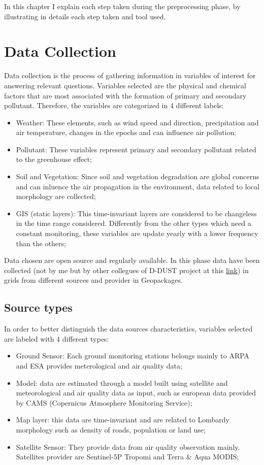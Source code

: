 In this chapter I explain each step taken during the preprocessing phase, by illustrating in details each step taken and tool used.
\section{Data Collection}
Data collection is the process of gathering information in variables of interest for answering relevant questions. 
Variables selected are the physical and chemical factors that are most associated with the formation of primary and secondary pollutant. 
Therefore, the variables are categorized in 4 different labels:
\begin{itemize}
\item Weather: These elements, such as wind speed and direction, precipitation and air temperature, changes in the epochs and can influence air pollution;
\item Pollutant: These variables represent primary and secondary pollutant related to the greenhouse effect;
\item Soil and Vegetation: Since soil and vegetation degradation are global concerns and can inluence the air propagation in the environment, data related to local morphology are collected;
\item GIS (static layers): This time-invariant layers are considered to be changeless in the time range considered. Differently from the other types which need a constant monitoring, these variables are update yearly with a lower frequency than the others;
\end{itemize}
Data chosen are open source and regularly available.
In this phase data have been collected (not by me but by other collegues of D-DUST project at this \href{https://docs.google.com/spreadsheets/d/1-5pwMSc1QlFyC8iIaA-l1fWhWtpqVio2/edit#gid=91313358}{link}) in grids from different sources and provider in Geopackages. 
\subsection{Source types}
In order to better distinguish the data sources characteristics, variables selected are labeled with 4 different types:
\begin{itemize}

\item Ground Sensor: Each ground monitoring stations belongs mainly to ARPA and ESA provides meterological and air quality data;
\item Model: data are estimated through a model built using satellite and meteorological and air quality data as input, such as european data provided by CAMS (Copernicus Atmosphere Monitoring Service);
\item Map layer: this data are time-invariant and are related to Lombardy morphology such as density of roads, population or land use; 
\item Satellite Sensor: They provide data from air quality observation mainly. Satellites provider are Sentinel-5P Tropomi and Terra \& Aqua MODIS;
\end{itemize}
